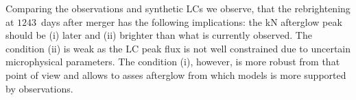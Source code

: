 %


Comparing the \GRB{} observations and synthetic \acp{LC} we observe, that the 
rebrightening at $1243$~days after merger has the following implications:
the \ac{kN} afterglow peak should be (i) later and (ii) brighter than what is
currently observed. 
%
The condition (ii) is weak as the \ac{LC} peak flux is not well constrained due to 
uncertain microphysical parameters.
The condition (i), however, is more robust from that point of view and allows to 
asses afterglow from which models is more supported by observations.

